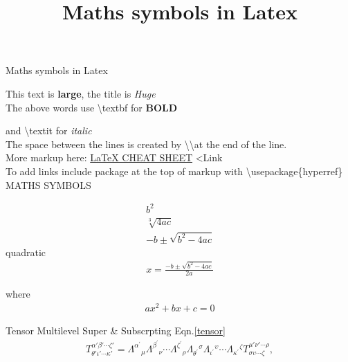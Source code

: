 \documentclass{article}		%
\title{Maths symbols in Latex}
\begin{document}
\begin{Huge}
Maths symbols in Latex\\
\end{Huge}


\begin{large}
This text is \textbf{large}, the title is \textit{Huge}\\

The above words use \textbackslash textbf for \textbf{BOLD}

and \textbackslash textit for \textit{italic}\\

The space between the lines is created by \textbackslash \textbackslash  at the end of the line.\\

More markup here: 
\href{https://www.nyu.edu/projects/beber/files/Chang_LaTeX_sheet.pdf}{LaTeX CHEAT SHEET} \textless Link \\
To add links include package at the top of markup with \textbackslash usepackage\{hyperref\} \\

  
  MATHS SYMBOLS
\end{large}

  \begin{align}
   \nonumber			%
  b^2\\				%
   \nonumber			%
  \sqrt[3]{4ac}\\
   \nonumber
  -b \pm \sqrt{b^2 - 4ac}
  \end{align} 
quadratic  
  \begin{align}
  x = \frac{-b \pm \sqrt{b^2 - 4ac}}{2a} 
  \end{align} 
  
  where
  \begin{align}
    ax^2 +bx +c =0
  \end{align} 
  
  Tensor Multilevel Super \& Subscrpting  Eqn.\ref{tensor}
  \begin{align}  
	T^{{\alpha\prime}{\beta\prime}\cdots{\zeta\prime}} _{{\theta\prime}{\iota\prime}\cdots{\kappa\prime}}  = \Lambda^{\alpha^\prime}
	 {_\mu\Lambda}^{\beta^\prime}{_\nu}\cdots\Lambda^{\zeta^\prime}{_\rho}\Lambda_{\theta^\prime}{^\sigma}
	 \Lambda_{\iota^\prime}{^\upsilon}\cdots\Lambda_{\kappa^\prime}{^\zeta}
	 T^{{\mu\prime}{\nu\prime}\cdots{\rho}} _{{\sigma\upsilon}\cdots{\zeta}},
	 \label{tensor}
  \end{align} 
\end{document}
